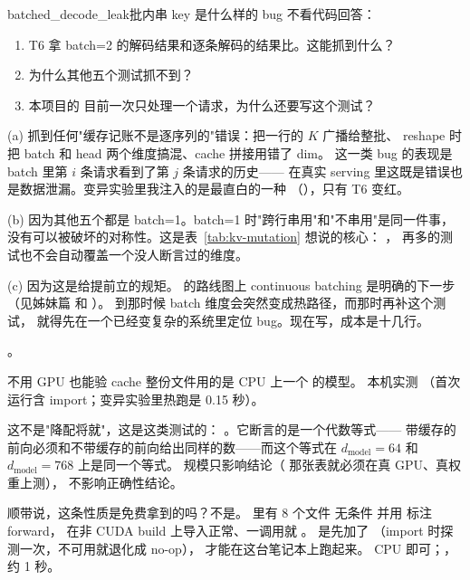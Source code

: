 \begin{checkpoint}{batched_decode_leak}{批内串 key 是什么样的 bug}
不看代码回答：
\begin{enumerate}[label=(\alph*)]
  \item T6 拿 batch=2 的解码结果和逐条解码的结果比。这能抓到什么？
  \item 为什么其他五个测试抓不到？
  \item 本项目的  目前一次只处理一个请求，为什么还要写这个测试？
\end{enumerate}

\ifshowanswers
\tcblower
\answer (a) 抓到任何"缓存记账不是逐序列的"错误：把一行的 $K$ 广播给整批、
reshape 时把 batch 和 head 两个维度搞混、cache 拼接用错了 dim。
这一类 bug 的表现是 batch 里第 $i$ 条请求看到了第 $j$ 条请求的历史——
在真实 serving 里这既是错误也是数据泄漏。变异实验里我注入的是最直白的一种
（），只有 T6 变红。

(b) 因为其他五个都是 batch=1。batch=1 时"跨行串用"和"不串用"是同一件事，
没有可以被破坏的对称性。这是表~\ref{tab:kv-mutation} 想说的核心：
，
再多的测试也不会自动覆盖一个没人断言过的维度。

(c) 因为这是给提前立的规矩。
 的路线图上 continuous batching 是明确的下一步
（见姊妹篇  和 ）。
到那时候 batch 维度会突然变成热路径，而那时再补这个测试，
就得先在一个已经变复杂的系统里定位 bug。现在写，成本是十几行。

\whereincode {}。
\fi
\end{checkpoint}

\begin{tipbox}{不用 GPU 也能验 cache}
 整份文件用的是 CPU 上一个
 的模型。
本机实测 （首次运行含 import；变异实验里热跑是 0.15 秒）。

这不是"降配将就"，这是这类测试的：
。它断言的是一个代数等式——
带缓存的前向必须和不带缓存的前向给出同样的数——而这个等式在
$d_{\text{model}}{=}64$ 和 $d_{\text{model}}{=}768$ 上是同一个等式。
规模只影响结论（ 那张表就必须在真 GPU、真权重上测），
不影响正确性结论。

顺带说，这条性质是免费拿到的吗？不是。 里有 8 个文件
无条件  并用  标注 forward，
在非 CUDA build 上导入正常、一调用就 。
是先加了 （import 时探测一次，不可用就退化成 no-op），
 才能在这台笔记本上跑起来。
\resources CPU 即可；，约 1 秒。
\end{tipbox}

